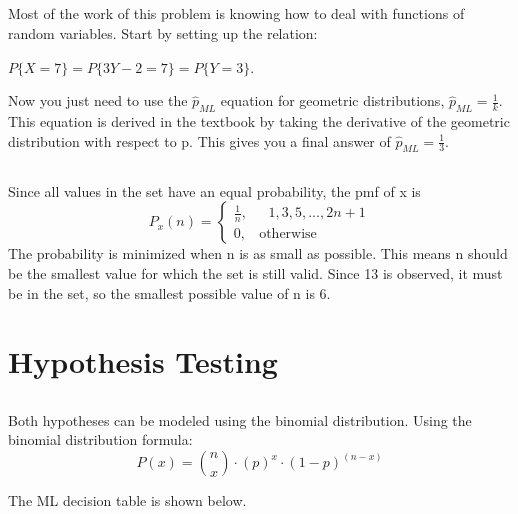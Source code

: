 \documentclass{exam}
\begin{document}
\subsection{}
Most of the work of this problem is knowing how to deal with functions of random variables. Start by setting up the relation:
 \begin{center}
$P\{X = 7\} = P\{3Y - 2 = 7\} = P\{Y = 3\}$. 
\newline
\end{center}
 Now you just need to use the $\widehat{p}_{ML}$ equation for geometric distributions, $\widehat{p}_{ML} = \frac{1}{k}$. This equation is derived in the textbook by taking the derivative of the geometric distribution with respect to p. This gives you a final answer of  $\widehat{p}_{ML} = \frac{1}{3}$.
\subsection{}
Since all values in the set have an equal probability, the pmf of x is 
\begin{equation}
    P_x(n) = \begin{cases}
    \frac{1}{n}, &\text{ $1,3,5,...,2n+1$} \\
    0, &\text{otherwise}
    \end{cases}
\end{equation}
The probability is minimized when n is as small as possible. This means n should be the smallest value for which the set is still valid. Since 13 is observed, it must be in the set, so the smallest possible value of n is 6.

\section{Hypothesis Testing}
\subsection{}
Both hypotheses can be modeled using the binomial distribution. Using the binomial distribution formula: 
\begin {equation}
P(x) = \binom{n}{x} \cdot (p)^x \cdot (1-p)^{(n-x)}
\end{equation}

The ML decision table is shown below.
\end{document}

